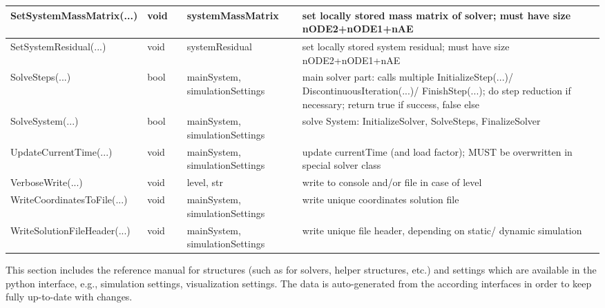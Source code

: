 \begin{center}
\begin{longtable}{| p{4.2cm} | p{2.5cm} | p{0.3cm} | p{3.0cm} | p{6cm} |}
    SetSystemMassMatrix(...) &     void &      &     systemMassMatrix &     set locally stored mass matrix of solver; must have size nODE2+nODE1+nAE\\ \hline
    SetSystemResidual(...) &     void &      &     systemResidual &     set locally stored system residual; must have size nODE2+nODE1+nAE\\ \hline
    SolveSteps(...) &     bool &      &     mainSystem, simulationSettings &     main solver part: calls multiple InitializeStep(...)/ DiscontinuousIteration(...)/ FinishStep(...); do step reduction if necessary; return true if success, false else\\ \hline
    SolveSystem(...) &     bool &      &     mainSystem, simulationSettings &     solve System: InitializeSolver, SolveSteps, FinalizeSolver\\ \hline
    UpdateCurrentTime(...) &     void &      &     mainSystem, simulationSettings &     update currentTime (and load factor); MUST be overwritten in special solver class\\ \hline
    VerboseWrite(...) &     void &      &     level, str &     write to console and/or file in case of level\\ \hline
    WriteCoordinatesToFile(...) &     void &      &     mainSystem, simulationSettings &     write unique coordinates solution file\\ \hline
    WriteSolutionFileHeader(...) &     void &      &     mainSystem, simulationSettings &     write unique file header, depending on static/ dynamic simulation\\ \hline
	  \end{longtable}
	\end{center}

This section includes the reference manual for structures (such as for solvers, helper structures, etc.) 
and settings which are available in the python interface, e.g., simulation settings, visualization settings. 
The data is auto-generated from the according interfaces in order to keep fully up-to-date with changes.
